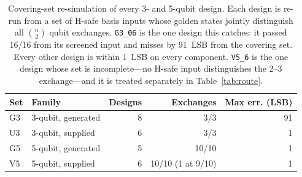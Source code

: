 \begin{table}[ht]
\centering
\caption{Covering-set re-simulation of every 3- and 5-qubit design. Each design is re-run from a set of H-safe basis inputs whose golden states jointly distinguish all $\binom{n}{2}$ qubit exchanges. \texttt{G3\_06} is the one design this catches: it passed 16/16 from its screened input and misses by 91~LSB from the covering set. Every other design is within 1~LSB on every component. \texttt{V5\_6} is the one design whose set is incomplete---no H-safe input distinguishes the 2--3 exchange---and it is treated separately in Table~\ref{tab:route}.}
\label{tab:coverage}
\begin{tabular}{@{}llrrr@{}}
\toprule
Set & Family & Designs & Exchanges & Max err. (LSB) \\
\midrule
G3 & 3-qubit, generated & 8 & 3/3 & 91 \\
U3 & 3-qubit, supplied & 6 & 3/3 & 1 \\
G5 & 5-qubit, generated & 5 & 10/10 & 1 \\
V5 & 5-qubit, supplied & 6 & 10/10 (1 at 9/10) & 1 \\
\bottomrule
\end{tabular}
\end{table}

